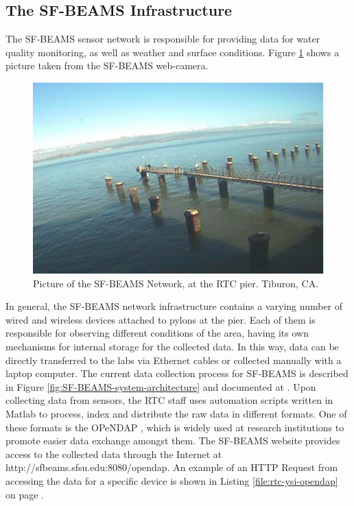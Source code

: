 \subsection{The SF-BEAMS Infrastructure}
\label{sec:sfbeams}

The SF-BEAMS sensor network is responsible for providing data for water quality
monitoring, as well as weather and surface conditions. Figure
\ref{fig:sf-beams} shows a picture taken from the SF-BEAMS web-camera.

\begin{figure}[!b]
  \centering
    \includegraphics[scale=0.7]{../diagrams/cam_image-oct15}
  \caption{Picture of the SF-BEAMS Network, at the RTC pier. Tiburon, CA.}
  \label{fig:sf-beams}
\end{figure}

In general, the SF-BEAMS network infrastructure contains a varying number of
wired and wireless devices attached to pylons at the pier. Each of them
is responsible for observing different conditions of the area, having its own
mechanisms for internal storage for the collected data. In this way, data can
be directly transferred to the labs via Ethernet cables or collected manually
with a laptop computer. The current data collection process for SF-BEAMS is
described in Figure \ref{fig:SF-BEAMS-system-architecture} and documented at
\cite{sfbeams-current-system}. Upon collecting data from sensors, the RTC
staff uses automation scripts written in Matlab \cite{matlab} to process,
index and distribute the raw data in different formats. One of these formats
is the OPeNDAP \cite{opendap}, which is widely used at research institutions
to promote easier data exchange amongst them. The SF-BEAMS website provides
access to the collected data through the Internet at
http://sfbeams.sfsu.edu:8080/opendap. An example of an HTTP Request from
accessing the data for a specific device is shown in Listing
\ref{file:rtc-ysi-opendap} on page \pageref{file:rtc-ysi-opendap}.

